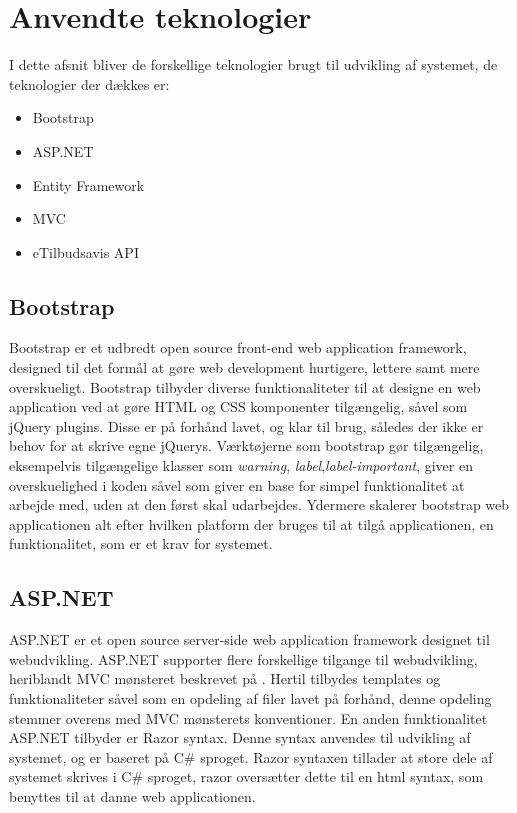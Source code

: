 \section{Anvendte teknologier}
I dette afsnit bliver de forskellige teknologier brugt til udvikling af systemet, de teknologier der dækkes er:
\begin {itemize}
  \item Bootstrap
  \item ASP.NET
  \item Entity Framework
  \item MVC
  \item eTilbudsavis API
\end {itemize}

\subsection{Bootstrap}
Bootstrap er et udbredt open source front-end web application framework, designed til det formål at gøre web development hurtigere, lettere samt mere overskueligt.
Bootstrap tilbyder diverse funktionaliteter til at designe en web application ved at gøre HTML og CSS komponenter tilgængelig, såvel som jQuery plugins.
Disse er på forhånd lavet, og klar til brug, således der ikke er behov for at skrive egne jQuerys.
Værktøjerne som bootstrap gør tilgængelig, eksempelvis tilgængelige klasser som \textit{warning}, \textit{label},\textit{label-important}, giver en overskuelighed i koden såvel som giver en base for simpel funktionalitet at arbejde med, uden at den først skal udarbejdes.
Ydermere skalerer bootstrap web applicationen alt efter hvilken platform der bruges til at tilgå applicationen, en funktionalitet, som er et krav for systemet.

\subsection{ASP.NET}
ASP.NET er et open source server-side web application framework designet til webudvikling.
ASP.NET supporter flere forskellige tilgange til webudvikling, heriblandt MVC mønsteret beskrevet på .
Hertil tilbydes templates og funktionaliteter såvel som en opdeling af filer lavet på forhånd, denne opdeling stemmer overens med MVC mønsterets konventioner.
En anden funktionalitet ASP.NET tilbyder er Razor syntax.
Denne syntax anvendes til udvikling af systemet, og er baseret på C# sproget.
Razor syntaxen tillader at store dele af systemet skrives i C# sproget, razor oversætter dette til en html syntax, som benyttes til at danne web applicationen.

